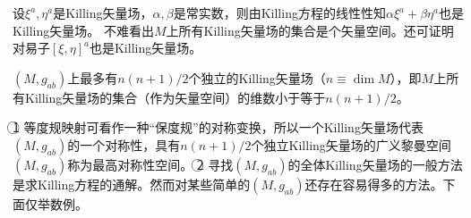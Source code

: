 设$\xi^a, \eta^a$是Killing矢量场，$\alpha, \beta$是常实数，则由Killing方程的线性性知$\alpha\xi^a + \beta\eta^a$也是Killing矢量场。
不难看出$M$上所有Killing矢量场的集合是个矢量空间。还可证明对易子$[\xi, \eta]^a$也是Killing矢量场。

\begin{theorem}
	$(M, g_{ab})$上最多有$n(n + 1) / 2$个独立的Killing矢量场（$n \equiv \dim M$），即$M$上所有Killing矢量场的集合（作为矢量空间）的维数小于等于$n(n + 1) / 2$。
\end{theorem}

\begin{note}
	\textcircled{1} 等度规映射可看作一种``保度规''的对称变换，所以一个Killing矢量场代表$(M, g_{ab})$的一个对称性，具有$n(n + 1) / 2$个独立Killing矢量场的广义黎曼空间$(M, g_{ab})$称为最高对称性空间。
	\textcircled{2} 寻找$(M, g_{ab})$的全体Killing矢量场的一般方法是求Killing方程的通解。然而对某些简单的$(M, g_{ab})$还存在容易得多的方法。下面仅举数例。
\end{note}

